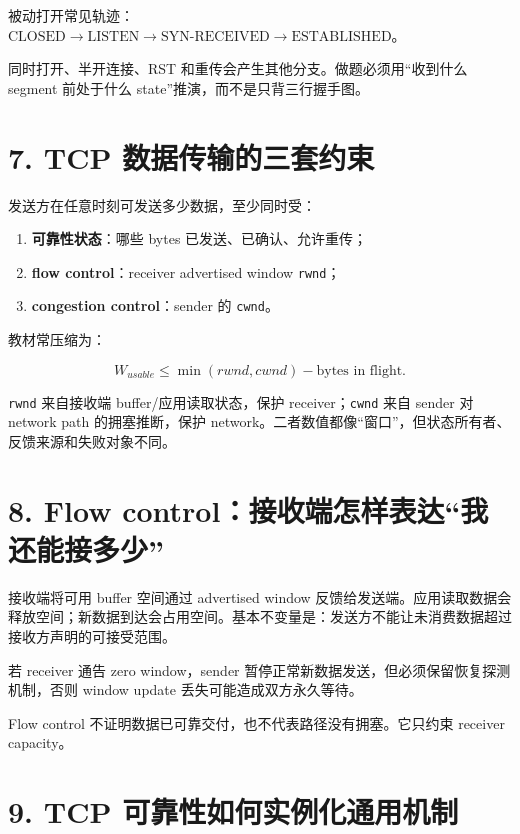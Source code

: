 \documentclass[UTF8,fontset=none,11pt,a4paper]{ctexart}
\providecommand{\tightlist}{\setlength{\itemsep}{0pt}\setlength{\parskip}{0pt}}
\providecommand{\passthrough}[1]{#1}
\begin{document}
被动打开常见轨迹：\(\text{CLOSED} \rightarrow \text{LISTEN} \rightarrow \text{SYN-RECEIVED} \rightarrow \text{ESTABLISHED}\)。

同时打开、半开连接、RST 和重传会产生其他分支。做题必须用``收到什么
segment 前处于什么 state''推演，而不是只背三行握手图。

\section{7. TCP
数据传输的三套约束}\label{6-tcp-ux6570ux636eux4f20ux8f93ux7684ux4e09ux5957ux7ea6ux675f}

发送方在任意时刻可发送多少数据，至少同时受：

\begin{enumerate}
\def\labelenumi{\arabic{enumi}.}
\tightlist
\item
  \textbf{可靠性状态}：哪些 bytes 已发送、已确认、允许重传；
\item
  \textbf{flow control}：receiver advertised window
  \passthrough{\lstinline!rwnd!}；
\item
  \textbf{congestion control}：sender 的
  \passthrough{\lstinline!cwnd!}。
\end{enumerate}

教材常压缩为：

\[
W_{usable}\le \min(rwnd,cwnd)-\text{bytes in flight}.
\]

\passthrough{\lstinline!rwnd!} 来自接收端 buffer/应用读取状态，保护
receiver；\passthrough{\lstinline!cwnd!} 来自 sender 对 network path
的拥塞推断，保护
network。二者数值都像``窗口''，但状态所有者、反馈来源和失败对象不同。

\section{8. Flow
control：接收端怎样表达``我还能接多少''}\label{7-flow-controlux63a5ux6536ux7aefux600eux6837ux8868ux8fbeux6211ux8fd8ux80fdux63a5ux591aux5c11}

接收端将可用 buffer 空间通过 advertised window
反馈给发送端。应用读取数据会释放空间；新数据到达会占用空间。基本不变量是：发送方不能让未消费数据超过接收方声明的可接受范围。

若 receiver 通告 zero window，sender
暂停正常新数据发送，但必须保留恢复探测机制，否则 window update
丢失可能造成双方永久等待。

Flow control 不证明数据已可靠交付，也不代表路径没有拥塞。它只约束
receiver capacity。

\section{9. TCP
可靠性如何实例化通用机制}\label{8-tcp-ux53efux9760ux6027ux5982ux4f55ux5b9eux4f8bux5316ux901aux7528ux673aux5236}
\end{document}
